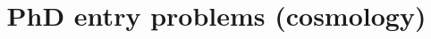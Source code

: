 \documentclass[11pt]{article}
\begin{document}
\title{PhD entry problems (cosmology)}
\maketitle
\end{document}
